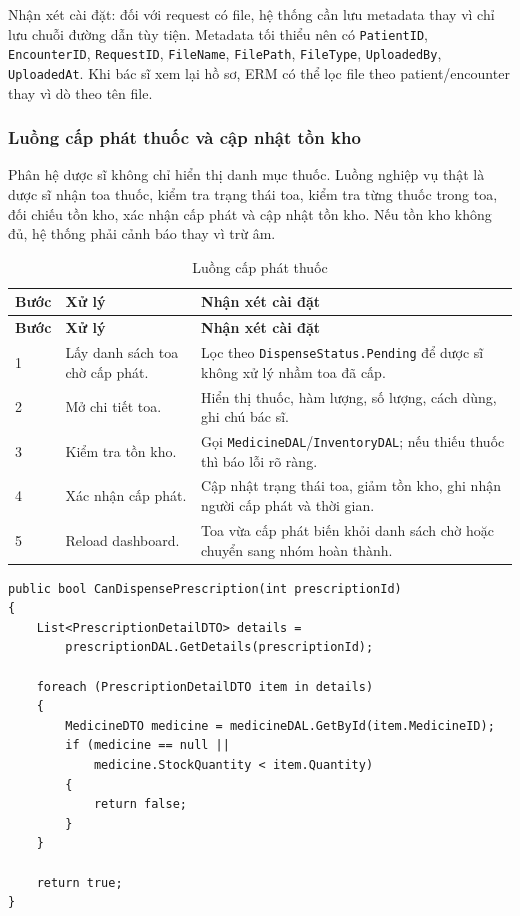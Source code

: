 \documentclass[12pt,a4paper]{article}
\numberwithin{figure}{subsection}
\numberwithin{table}{subsection}
\newcounter{codecounter}
\newenvironment{codeblock}[2]{%
    \refstepcounter{codecounter}%
    \phantomsection%
    \label{#1}%
    \par\smallskip
}{%
    \par\smallskip
}
\begin{document}
Nhận xét cài đặt: đối với request có file, hệ thống cần lưu metadata thay vì chỉ lưu chuỗi đường dẫn tùy tiện. Metadata tối thiểu nên có \texttt{PatientID}, \texttt{EncounterID}, \texttt{RequestID}, \texttt{FileName}, \texttt{FilePath}, \texttt{FileType}, \texttt{UploadedBy}, \texttt{UploadedAt}. Khi bác sĩ xem lại hồ sơ, ERM có thể lọc file theo patient/encounter thay vì dò theo tên file.

\subsubsection{Luồng cấp phát thuốc và cập nhật tồn kho}

Phân hệ dược sĩ không chỉ hiển thị danh mục thuốc. Luồng nghiệp vụ thật là dược sĩ nhận toa thuốc, kiểm tra trạng thái toa, kiểm tra từng thuốc trong toa, đối chiếu tồn kho, xác nhận cấp phát và cập nhật tồn kho. Nếu tồn kho không đủ, hệ thống phải cảnh báo thay vì trừ âm.

\begin{longtable}{|p{3cm}|p{4.8cm}|p{5.4cm}|}
\caption{Luồng cấp phát thuốc} \\
\hline
\textbf{Bước} & \textbf{Xử lý} & \textbf{Nhận xét cài đặt} \\
\hline
\endfirsthead
\hline
\textbf{Bước} & \textbf{Xử lý} & \textbf{Nhận xét cài đặt} \\
\hline
\endhead
1 & Lấy danh sách toa chờ cấp phát. & Lọc theo \texttt{DispenseStatus.Pending} để dược sĩ không xử lý nhầm toa đã cấp. \\
\hline
2 & Mở chi tiết toa. & Hiển thị thuốc, hàm lượng, số lượng, cách dùng, ghi chú bác sĩ. \\
\hline
3 & Kiểm tra tồn kho. & Gọi \texttt{MedicineDAL}/\texttt{InventoryDAL}; nếu thiếu thuốc thì báo lỗi rõ ràng. \\
\hline
4 & Xác nhận cấp phát. & Cập nhật trạng thái toa, giảm tồn kho, ghi nhận người cấp phát và thời gian. \\
\hline
5 & Reload dashboard. & Toa vừa cấp phát biến khỏi danh sách chờ hoặc chuyển sang nhóm hoàn thành. \\
\hline
\end{longtable}

\begin{codeblock}{code:dispense-stock-check}{Kiểm tra tồn kho trước khi cấp phát}
\begin{verbatim}
public bool CanDispensePrescription(int prescriptionId)
{
    List<PrescriptionDetailDTO> details =
        prescriptionDAL.GetDetails(prescriptionId);

    foreach (PrescriptionDetailDTO item in details)
    {
        MedicineDTO medicine = medicineDAL.GetById(item.MedicineID);
        if (medicine == null ||
            medicine.StockQuantity < item.Quantity)
        {
            return false;
        }
    }

    return true;
}
\end{verbatim}
\end{codeblock}
\end{document}
